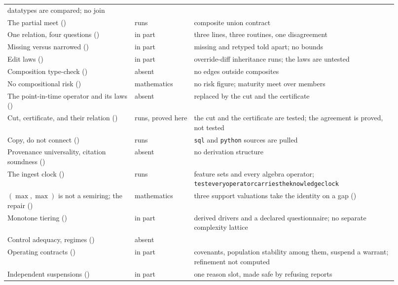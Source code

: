 \documentclass[11pt,a4paper]{article}
\renewcommand{\_}{\oldunderscore\allowbreak}
\theoremstyle{plain}
\theoremstyle{definition}
\theoremstyle{definition}
\theoremstyle{remark}
\begin{document}
\begin{center}
\begin{longtable}{@{}L{0.30\linewidth}L{0.14\linewidth}L{0.48\linewidth}@{}}
datatypes are compared; no join \\
The partial meet () & runs & composite union contract \\
One relation, four questions () & in part & three lines, three routines, one
disagreement \\
Missing versus narrowed () & in part & missing and retyped told apart; no bounds \\
Edit laws () & in part & override-diff inheritance runs; the laws are untested \\
Composition type-check () & absent & no edges outside composites \\
No compositional risk () & mathematics & no risk figure; maturity meet over members \\
The point-in-time operator and its laws () & absent & replaced by
the cut and the certificate \\
Cut, certificate, and their relation () & runs,
proved here & the cut and the certificate are tested; the agreement is proved, not tested \\
Copy, do not connect () & runs & \texttt{sql} and \texttt{python} sources are pulled \\
Provenance universality, citation soundness () & absent & no
derivation structure \\
The ingest clock () & runs & feature sets and every algebra operator;
\texttt{test\_every\_operator\_carries\_the\_knowledge\_clock} \\
$(\max,\max)$ is not a semiring; the repair () & mathematics & three
support valuations take the identity on a gap () \\
Monotone tiering () & in part & derived drivers and a declared
questionnaire; no separate complexity lattice \\
Control adequacy, regimes () & absent & \\
Operating contracts () & in part & covenants, population stability among them,
suspend a warrant; refinement not computed \\
Independent suspensions () & in part & one reason slot, made safe by refusing reports

\end{longtable}
\end{center}
\end{document}
